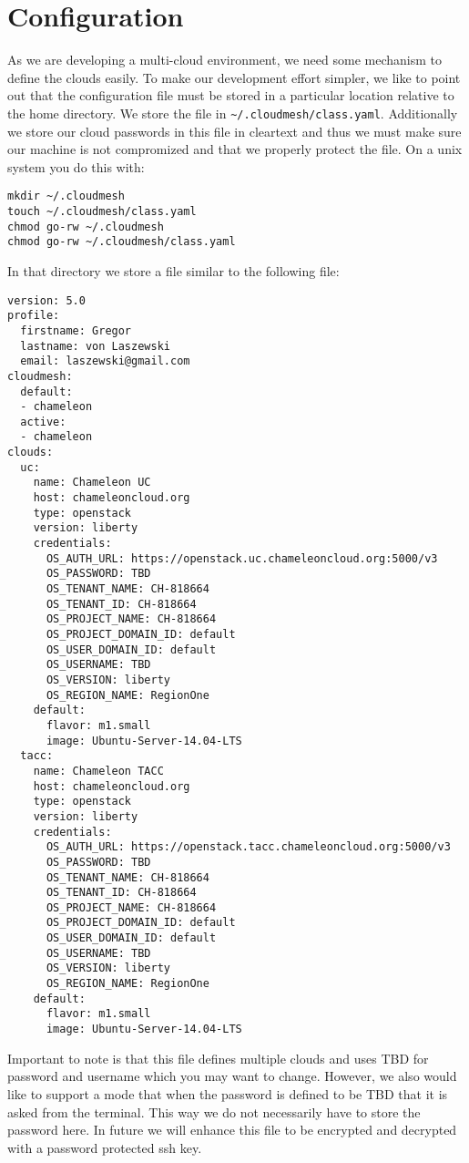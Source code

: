 \section{Configuration}

As we are developing a multi-cloud environment, we need some mechanism
to define the clouds easily. To make our development effort simpler,
we like to point out that the configuration file must be stored in a
particular location relative to the home directory. We store the file
in \verb|~/.cloudmesh/class.yaml|. Additionally we store our cloud
passwords in this file in cleartext and thus we must make sure our
machine is not compromized and that we properly protect the file. On a
unix system you do this with:

\begin{verbatim}
mkdir ~/.cloudmesh
touch ~/.cloudmesh/class.yaml
chmod go-rw ~/.cloudmesh
chmod go-rw ~/.cloudmesh/class.yaml
\end{verbatim}

In that directory we store a file similar to the following file:

\begin{verbatim}
version: 5.0
profile:
  firstname: Gregor
  lastname: von Laszewski
  email: laszewski@gmail.com
cloudmesh:
  default:
  - chameleon 
  active:
  - chameleon
clouds:
  uc:
    name: Chameleon UC
    host: chameleoncloud.org
    type: openstack
    version: liberty
    credentials:
      OS_AUTH_URL: https://openstack.uc.chameleoncloud.org:5000/v3
      OS_PASSWORD: TBD
      OS_TENANT_NAME: CH-818664
      OS_TENANT_ID: CH-818664
      OS_PROJECT_NAME: CH-818664
      OS_PROJECT_DOMAIN_ID: default
      OS_USER_DOMAIN_ID: default
      OS_USERNAME: TBD
      OS_VERSION: liberty
      OS_REGION_NAME: RegionOne
    default:
      flavor: m1.small
      image: Ubuntu-Server-14.04-LTS
  tacc:
    name: Chameleon TACC
    host: chameleoncloud.org
    type: openstack
    version: liberty
    credentials:
      OS_AUTH_URL: https://openstack.tacc.chameleoncloud.org:5000/v3
      OS_PASSWORD: TBD
      OS_TENANT_NAME: CH-818664
      OS_TENANT_ID: CH-818664
      OS_PROJECT_NAME: CH-818664
      OS_PROJECT_DOMAIN_ID: default
      OS_USER_DOMAIN_ID: default
      OS_USERNAME: TBD
      OS_VERSION: liberty
      OS_REGION_NAME: RegionOne
    default:
      flavor: m1.small
      image: Ubuntu-Server-14.04-LTS
\end{verbatim}

Important to note is that this file defines multiple clouds and uses
TBD for password and username which you may want to change. However,
we also would like to support a mode that when the password is defined
to be TBD that it is asked from the terminal. This way we do not
necessarily have to store the password here. In future we will enhance
this file to be encrypted and decrypted with a password protected ssh
key.

